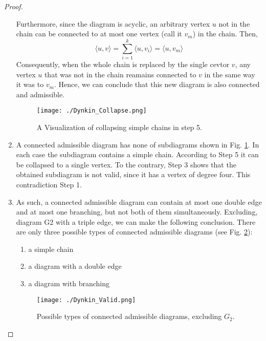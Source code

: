 \begin{proof}
\begin{enumerate}
        Furthermore, since the diagram is acyclic, an arbitrary vertex $u$ not in the chain can be connected  to at most one vertex 
        (call it $v_m$) in the chain. Then,
            \begin{equation*}
                \langle u, v \rangle = \sum_{i=1}^{k} \langle u, v_i\rangle = \langle u, v_m \rangle
            \end{equation*}
        Consequently, when the whole chain is replaced by the single cevtor $v$, any vertex $u$ that was not in the chain reamains connected
        to $v$ in the same way it was to $v_m$. Hence, we can conclude that this new diagram is also connected and admissible.
        
        \begin{figure}
            \centering
            \texttt{[image: ./Dynkin\_Collapse.png]}
            \caption{A Visualization of collapsing simple chains in step 5.}
            \label{img:collapse}
        \end{figure}
    
        \item A connected admissible diagram has none of subdiagrams shown in Fig. \ref{img:collapse}.
        In each case the subdiagram contains a simple chain.
        According to Step 5 it can be collapsed to a single vertex. To the contrary, Step 3 shows that the obtained subdiagram is not
        valid, since it has a vertex of degree four. This contradiction Step 1.

        \item As such, a connected admissible diagram can contain at most one double edge and at most one branching, but not both
        of them simultaneously. Excluding, diagram G2 with a triple edge, we can make the following conclusion.
        There are only three possible types of connected admissible diagrams (see Fig. \ref{img:valid}):
        
        \begin{enumerate}[start=1,label={\bfseries T\arabic*:}]
            \item a simple chain
            \item a diagram with a double edge
            \item a diagram with branching
        \end{enumerate}
    
        \begin{figure}[h]
            \centering
            \texttt{[image: ./Dynkin\_Valid.png]}
            \caption{Possible types of connected admissible diagrams, excluding $G_2$.}
            \label{img:valid}
        \end{figure}


\end{enumerate}
\end{proof}
